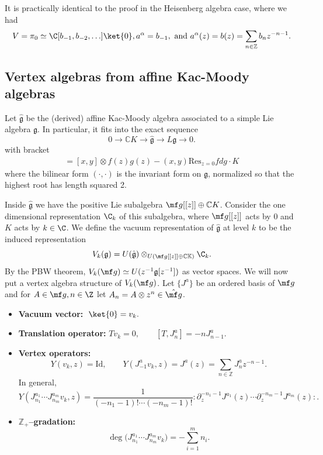 \documentclass[12pt]{article}
\begin{document}
It is practically identical to the proof in the Heisenberg algebra case,
where we had \begin{align*}
    V=\pi_0\simeq\C[b_{-1},b_{-2},\ldots]\ket{0},
    a^\alpha=b_{-1}, \text{ and } a^\alpha(z)=b(z)=\sum_{n\in\mathbb{Z}} b_n z^{-n-1}.
\end{align*}

\subsection{Vertex algebras from affine Kac-Moody algebras}
Let $\hat{\mathfrak{g}}$ be the (derived) affine Kac-Moody algebra associated to a simple Lie algebra $\mathfrak{g}$. In particular, it fits into the exact sequence
\[0 \to \mathbb{C}K \to \hat{\mathfrak{g}} \to L\mathfrak{g} \to 0.\]
with bracket
\begin{align*}
    [x\otimes f(z), y\otimes g(z)] = [x,y]\otimes f(z)g(z) - (x,y)\mathrm{Res}_{z=0} f dg \cdot K
\end{align*} where the bilinear form $(\cdot,\cdot)$ is the invariant form on $\mathfrak{g}$, normalized so that the highest root has length squared 2.

Inside $\hat{\mathfrak{g}}$ we have the positive Lie subalgebra $\mf g[[z]] \oplus \mathbb{C}K$. Consider the one dimensional representation $\C_k$ of this subalgebra, where $\mf g[[z]]$ acts by 0 and $K$ acts by $k\in\C$. We define the vacuum representation of $\hat{\mathfrak{g}}$ at level $k$ to be the induced representation
\[V_k(\mathfrak{g}) = U(\hat{\mathfrak{g}}) \otimes_{U(\mf g[[z]] \oplus \mathbb{CK})} \C_k.\]
By the PBW theorem, $V_k(\mf g) \simeq U(z^{-1}\mathfrak g[z^{-1}])$ as vector spaces. We will now put a vertex algebra structure of $V_k(\mf g)$. Let $\{J^a\}$ be an ordered basis of $\mf g$ and for $A\in \mf g, n\in \Z$ let $A_n = A\otimes z^n \in \hat{\mf g}$.
\begin{itemize}
    \item \textbf{Vacuum vector:} $\;\ket{0}=v_k.$
    \item \textbf{Translation operator:} $T v_k = 0,\qquad [T, J^a_n] = -n J^a_{n-1}.$
\end{itemize}

\begin{itemize}
    \item \textbf{Vertex operators:}
          \[
              Y(v_k,z) = \mathrm{Id},\qquad
              Y(J^a_{-1} v_k, z) = J^a(z) = \sum_{n\in\mathbb{Z}} J^a_n z^{-n-1}.
          \]
          In general,
          \begin{equation}\label{2.4.5}
              Y(J^{a_1}_{n_1}\cdots J^{a_m}_{n_m} v_k, z)
              = \frac{1}{(-n_1-1)!\cdots(-n_m-1)!}
              :\partial_z^{-n_1-1} J^{a_1}(z)\cdots \partial_z^{-n_m-1} J^{a_m}(z):.
          \end{equation}

    \item \textbf{$\mathbb{Z}_+$–gradation:}
          \[
              \deg\!\big(J^{a_1}_{n_1}\cdots J^{a_m}_{n_m} v_k\big)
              = -\sum_{i=1}^m n_i.
          \]
\end{itemize}
\end{document}
